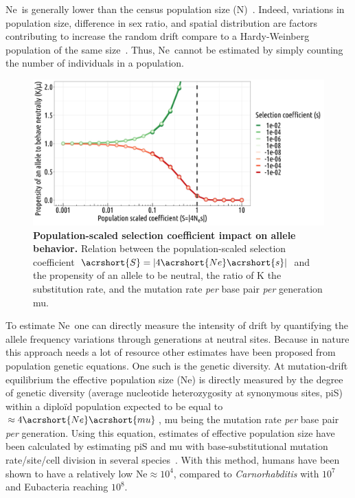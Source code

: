 \acrshort{Ne}~is generally lower than the census population size (\acrshort{N})~\citep{palstra_genetic_2008, palstra_effectivecensus_2012}. Indeed, variations in population size, difference in sex ratio, and spatial distribution are factors contributing to increase the random drift compare to a Hardy-Weinberg population of the same size~\citep{waples_effective_2002, waples_life-history_2016}. Thus, \acrshort{Ne}~cannot be estimated by simply counting the number of individuals in a population.

\begin{figure}[H]
    \centering
    \includegraphics[width=\linewidth]{figures/pop scaled coefficient.png}
        \caption[Population-scaled selection coefficient impact on allele behavior]{\textbf{Population-scaled selection coefficient impact on allele behavior.} Relation between the population-scaled selection coefficient $\acrshort{S} = |4\acrshort{Ne}\acrshort{s}|$ and the propensity of an allele to be neutral, the ratio of \acrshort{K} the \gls{substitution} rate, and the mutation rate \textit{per} base pair \textit{per} generation \acrshort{mu}.}
    \label{fig:popscaled}
\end{figure}


To estimate \acrshort{Ne}~one can directly measure the intensity of drift by quantifying the allele frequency variations through generations at neutral sites. Because in nature this approach needs a lot of resource other estimates have been proposed from population genetic equations. One such is the genetic diversity. At mutation-drift equilibrium the \gls{effective population size} (\acrshort{Ne}) is directly measured by the degree of genetic diversity (average nucleotide heterozygosity at synonymous sites, \acrshort{piS}) within a \gls{diploïd} population expected to be equal to $\approx4\acrshort{Ne} \acrshort{mu}$, \acrshort{mu} being the mutation rate \textit{per} base pair \textit{per} generation. Using this equation, estimates of \gls{effective population size} have been calculated by estimating \acrshort{piS} and \acrshort{mu} with base-substitutional mutation rate/site/cell division in several species~\citep{sung_drift-barrier_2012, lynch_divergence_2023}. With this method, humans have been shown to have a relatively low \acrshort{Ne}$\approx10^4$, compared to \textit{Carnorhabditis} with $10^7$ and Eubacteria reaching $10^8$. 

